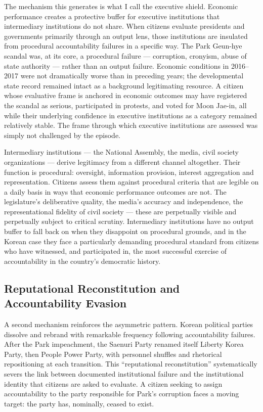 \documentclass[
  12pt,
  letterpaper]{article}
\begin{document}
The mechanism this generates is what I call the executive shield.
Economic performance creates a protective buffer for executive
institutions that intermediary institutions do not share. When citizens
evaluate presidents and governments primarily through an output lens,
those institutions are insulated from procedural accountability failures
in a specific way. The Park Geun-hye scandal was, at its core, a
procedural failure --- corruption, cronyism, abuse of state authority
--- rather than an output failure. Economic conditions in 2016--2017
were not dramatically worse than in preceding years; the developmental
state record remained intact as a background legitimating resource. A
citizen whose evaluative frame is anchored in economic outcomes may have
registered the scandal as serious, participated in protests, and voted
for Moon Jae-in, all while their underlying confidence in executive
institutions as a category remained relatively stable. The frame through
which executive institutions are assessed was simply not challenged by
the episode.

Intermediary institutions --- the National Assembly, the media, civil
society organizations --- derive legitimacy from a different channel
altogether. Their function is procedural: oversight, information
provision, interest aggregation and representation. Citizens assess them
against procedural criteria that are legible on a daily basis in ways
that economic performance outcomes are not. The legislature's
deliberative quality, the media's accuracy and independence, the
representational fidelity of civil society --- these are perpetually
visible and perpetually subject to critical scrutiny. Intermediary
institutions have no output buffer to fall back on when they disappoint
on procedural grounds, and in the Korean case they face a particularly
demanding procedural standard from citizens who have witnessed, and
participated in, the most successful exercise of accountability in the
country's democratic history.

\subsection{Reputational Reconstitution and Accountability
Evasion}\label{reputational-reconstitution-and-accountability-evasion}

A second mechanism reinforces the asymmetric pattern. Korean political
parties dissolve and rebrand with remarkable frequency following
accountability failures. After the Park impeachment, the Saenuri Party
renamed itself Liberty Korea Party, then People Power Party, with
personnel shuffles and rhetorical repositioning at each transition. This
``reputational reconstitution'' systematically severs the link between
documented institutional failure and the institutional identity that
citizens are asked to evaluate. A citizen seeking to assign
accountability to the party responsible for Park's corruption faces a
moving target: the party has, nominally, ceased to exist.
\end{document}

